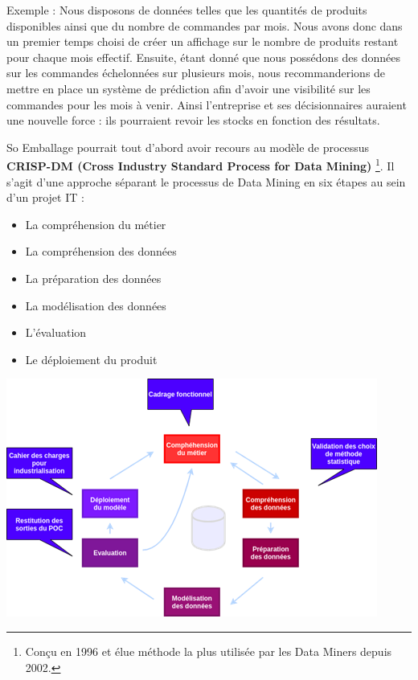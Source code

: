 Exemple : Nous disposons de données telles que les quantités de produits disponibles ainsi que du nombre de commandes par mois. Nous avons donc dans un premier temps choisi de créer un affichage sur le nombre de produits restant pour chaque mois effectif. Ensuite, étant donné que nous possédons des données sur les commandes échelonnées sur plusieurs mois, nous recommanderions de mettre en place un système de prédiction afin d’avoir une visibilité sur les commandes pour les mois à venir. Ainsi l’entreprise et ses décisionnaires auraient une nouvelle force : ils pourraient revoir les stocks en fonction des résultats.  \vertspace

So Emballage pourrait tout d’abord avoir recours au modèle de processus \textbf{CRISP-DM (Cross Industry Standard Process for Data Mining)} \footnote{Conçu en 1996 et élue méthode la plus utilisée par les Data Miners depuis 2002.}. Il s’agit d’une approche séparant le processus de Data Mining en six étapes au sein d’un projet IT :  
 
\begin{itemize}[label=\textbullet, font=\LARGE \color{listGreen}]
	\item La compréhension du métier 
	\item La compréhension des données  
	\item La préparation des données 
	\item La modélisation des données 
	\item L’évaluation
	\item Le déploiement du produit 
\end{itemize}  

\begin{center}
	\includegraphics[scale=0.8]{images/data_mining_crispdm.png} 
\end{center} 

